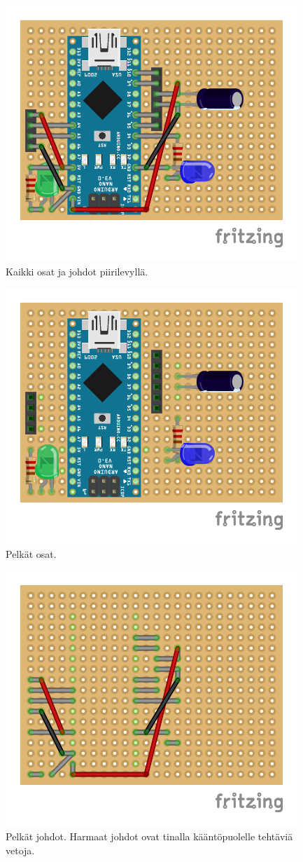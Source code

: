 \documentclass[12pt,a4paper]{article}
\begin{document}
    \begin{figure}
        \centering
        \includegraphics{piirilevy_kaikki}
        \caption{Kaikki osat ja johdot piirilevyllä.}
    \end{figure}

    \begin{figure}
        \centering
        \includegraphics{piirilevy_osat}
        \caption{Pelkät osat.}
    \end{figure}

    \begin{figure}
        \centering
        \includegraphics{piirilevy_johdot}
        \caption{Pelkät johdot. Harmaat johdot ovat tinalla kääntöpuolelle tehtäviä vetoja.}
    \end{figure}
\end{document}
